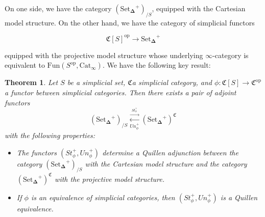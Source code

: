 \documentclass[12pt]{amsart}
\newcommand{\8}{\ensuremath{\infty}}
\newcommand{\C}{\ensuremath{\mathfrak{C}}}
\newcommand{\SSet}{\ensuremath{\text{Set}_{\boldsymbol{\Delta}}}}
\newcommand{\op}[1]{\ensuremath{{#1}^{\text{op}}}}
\newcommand{\adj}[2]{\ensuremath{\overset{\overset{#1}{ \rightarrow}}{\underset{#2}{\leftarrow}}}}
\newtheorem{theorem}{Theorem}
\begin{document}
{{On one side, we have the category $(\SSet^+)_{/S}$, equipped with the Cartesian model structure. On the other hand, we have the category of simplicial functors

$$
  \op{\mathfrak{C}[S]} \rightarrow \SSet^+
$$

equipped with the projective model structure whose underlying \8-category is equivalent to $\text{Fun}(\op{S}, \text{Cat}_\8). $ We have the following key result:

\begin{theorem}
  Let $S$ be a simplicial set, \C a simplicial category, and $\phi: \mathfrak{C}[S] \rightarrow \op\C$ a functor between simplicial categories. Then there exists a pair of adjoint functors
  \[(\SSet^+)_{/S} \adj{St_\phi^+}{Un_\phi^+} (\SSet^+)^\C\]
  with the following properties:
  \begin{itemize}
    \item[(1)] The functors $(St_\phi^+, Un_\phi^+)$ determine a Quillen adjunction between the category $(\SSet^+)_{/S}$ with the Cartesian model structure and the category $(\SSet^+)^\C$ with the projective model structure.
    \item[(2)] If $\phi$ is an equivalence of simplicial categories, then $(St_\phi^+, Un_\phi^+)$ is a Quillen equivalence.
  \end{itemize}
\end{theorem}

}}
\end{document}
